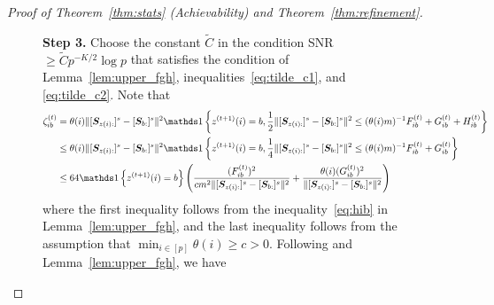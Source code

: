 \documentclass[journal]{IEEEtran}
\theoremstyle{definition}
\theoremstyle{definition}
\newcommand{\of}[1]{\left(#1\right)}
\newcommand{\offf}[1]{\left\{#1\right\}}
\newcounter{MYtempeqncnt}
\begin{document}
\begin{proof}[Proof of Theorem~\ref{thm:stats} (Achievability) and Theorem~\ref{thm:refinement}]
    
\begin{figure}[t] 
{\bf Step 3.}  Choose the constant $\tilde C$ in the condition SNR $\geq \tilde C p^{-K/2} \log p$ that satisfies the condition of Lemma~\ref{lem:upper_fgh}, inequalities~\eqref{eq:tilde_c1}, and \eqref{eq:tilde_c2}. Note that  \begin{align}
        \zeta_{ib}^{(t)} &= \theta(i) \onormSize{}{ [ \mS_{ z(i):}  ]^s - [ \mS_{b:}  ]^s  }^2 \ind \offf{z^{(t+1)}(i) = b, \frac{1}{2}\onormSize{}{ [ \mS_{z(i):}  ]^s - [ \mS_{b:}  ]^s  }^2 \leq (\theta(i) m)^{-1} F_{ib}^{(t)} + G_{ib}^{(t)} + H_{ib}^{(t)} }\\
        & \leq \theta(i) \onormSize{}{ [ \mS_{ z(i):}  ]^s - [ \mS_{b:}  ]^s  }^2 \ind \offf{z^{(t+1)}(i) = b, \frac{1}{4}\onormSize{}{ [ \mS_{z(i):}  ]^s - [ \mS_{b:}  ]^s  }^2 \leq (\theta(i) m)^{-1} F_{ib}^{(t)} + G_{ib}^{(t)} } \\
        & \leq 64 \ind \offf{ z^{(t+1)}(i) = b} \of{  \frac{(F_{ib}^{(t)})^2}{ cm^2\onormSize{}{ [ \mS_{z(i):}  ]^s - [ \mS_{b:}  ]^s  }^2} + \frac{\theta(i)(G_{ib}^{(t)})^2}{ \onormSize{}{ [ \mS_{z(i):}  ]^s - [ \mS_{b:}  ]^s  }^2}    }
    \end{align}
    where the first inequality follows from the inequality~\eqref{eq:hib} in Lemma~\ref{lem:upper_fgh}, and the last inequality follows from the assumption that $\min_{i \in [p]} \theta(i) \geq c>0$. Following \cite[Step 4, Proof of Theorem 2]{han2020exact} and Lemma~\ref{lem:upper_fgh}, we have 
\setcounter{MYtempeqncnt}{\value{equation}} 


\end{figure}
\end{proof}
\end{document}
